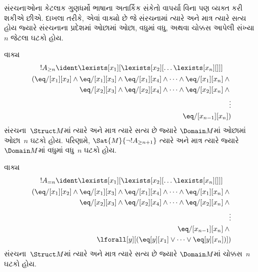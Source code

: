 \begingroup
\makeatletter{}\makeatother


\label{guunit:OLP-0173}


\begin{explain}
સંરચનાઓના કેટલાક ગુણધર્મો ભાષાના અતાર્કિક સંકેતો વાપર્યા વિના પણ
વ્યક્ત કરી શકીએ છીએ. દાખલા તરીકે, એવાં વાક્યો છે જે
સંરચનામાં ત્યારે અને માત્ર ત્યારે સત્ય હોય જ્યારે
સંરચનાના પ્રદેશમાં ઓછામાં ઓછા, વધુમાં વધુ, અથવા ચોક્કસ
આપેલી સંખ્યા~$n$ જેટલા ઘટકો હોય.
\end{explain}

\begin{prop}
વાક્ય
\begin{multline*}
  !A_{\ge n} \ident \lexists[x_1][\lexists[x_2][\dots\lexists[x_n][{}]]]\\
  \begin{aligned}
  (\eq/[x_1][x_2] \land {}
  \eq/[x_1][x_3] \land \eq/[x_1][x_4] \land \dots \land \eq/[x_1][x_n] \land {}\\
\eq/[x_2][x_3] \land \eq/[x_2][x_4] \land \dots \land {} \eq/[x_2][x_n] \land {} \\
\vdots\\
\eq/[x_{n-1}][x_n])
\end{aligned}
\end{multline*}
સંરચના~$\Struct M$માં ત્યારે અને માત્ર ત્યારે સત્ય છે જ્યારે
$\Domain M$માં ઓછામાં ઓછા~$n$ ઘટકો હોય. પરિણામે,
$\Sat{M}{\lnot !A_{\ge n+1}}$ ત્યારે અને માત્ર ત્યારે જ્યારે
$\Domain M$માં વધુમાં વધુ~$n$ ઘટકો હોય.

\end{prop}

\begin{prop}
વાક્ય
\begin{multline*}
!A_{= n} \ident \lexists[x_1][\lexists[x_2][\dots\lexists[x_n][{}]]] \\
\begin{aligned}
  (\eq/[x_1][x_2] \land {}
  \eq/[x_1][x_3] \land \eq/[x_1][x_4] \land \dots \land \eq/[x_1][x_n] \land {}\\
\eq/[x_2][x_3] \land \eq/[x_2][x_4] \land \dots \land {} \eq/[x_2][x_n] \land {} \\
\vdots\\
\eq/[x_{n-1}][x_n] \land {} \\
\lforall[y][(\eq[y][x_1] \lor \dots \lor \eq[y][x_n])])
\end{aligned}
\end{multline*}
સંરચના~$\Struct M$માં ત્યારે અને માત્ર ત્યારે સત્ય છે જ્યારે
$\Domain M$માં ચોક્કસ~$n$ ઘટકો હોય.
\end{prop}

